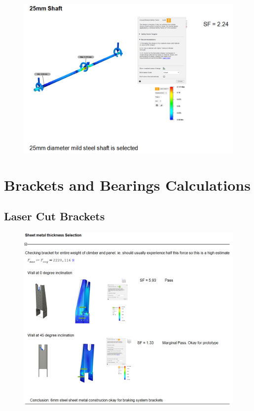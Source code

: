 \begin{figure}[H]
    \centering
    \includegraphics[width=0.7\linewidth]{chaps-append/calcs/main_shaft_calcs_2.png}
\end{figure}

\section{Brackets and Bearings Calculations}
\label{calcs:brackets_bearings}

\subsection*{Laser Cut Brackets}

\begin{figure}[H]
    \centering
    \includegraphics[width=1\linewidth]{chaps-append/calcs/FEM_brackets.png}
\end{figure}

